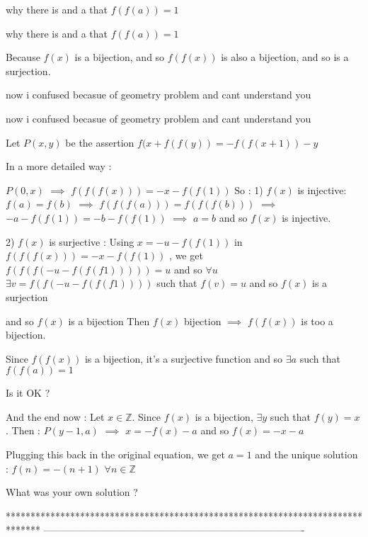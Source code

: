 \begin{solution}
	why there is and a that $ f(f(a))=1$
\end{solution}



\begin{solution}
	\begin{tcolorbox}why there is and a that $ f(f(a)) = 1$\end{tcolorbox}

Because $ f(x)$ is a bijection, and so $ f(f(x))$ is also a bijection, and so is a surjection.
\end{solution}



\begin{solution}
	now i confused becasue of geometry problem and cant understand you
\end{solution}



\begin{solution}
	\begin{tcolorbox}now i confused becasue of geometry problem and cant understand you\end{tcolorbox}
Let $ P(x,y)$ be the assertion $ f(x + f(f(y)) = - f(f(x + 1)) - y$

In a more detailed way :

$ P(0,x)$ $ \implies$ $ f(f(f(x))) = - x - f(f(1))$  So :
1) $ f(x)$ is injective:
$ f(a)=f(b)$ $ \implies$ $ f(f(f(a)))=f(f(f(b)))$ $ \implies$ $ - a - f(f(1))=- b - f(f(1))$ $ \implies$ $ a=b$ and so $ f(x)$ is injective.

2) $ f(x)$ is surjective :
Using $ x=-u-f(f(1))$ in $ f(f(f(x))) = - x - f(f(1))$  , we get $ f(f(f(-u-f(f(f1))))) = u$ and so $ \forall u$ $ \exists v=f(f(-u-f(f(f1))))$ such that $ f(v)=u$ and so $ f(x)$ is a surjection


and so $ f(x)$ is a bijection
Then $ f(x)$ bijection $ \implies$ $ f(f(x))$ is too a bijection.

Since $ f(f(x))$ is a bijection, it's a surjective function and so $ \exists a$ such that $ f(f(a)) = 1$

Is it OK ?

And the end now :
Let $ x\in\mathbb Z$. Since $ f(x)$ is a bijection, $ \exists y$ such that $ f(y) = x$. Then : $ P(y - 1,a)$ $ \implies$ $ x = - f(x) - a$ and so $ f(x) = - x - a$

Plugging this back in the original equation, we get $ a = 1$ and the unique solution : $ \boxed{f(n) = - (n + 1)}$ $ \forall n\in\mathbb Z$


What was your own solution ?
\end{solution}
*******************************************************************************
-------------------------------------------------------------------------------

